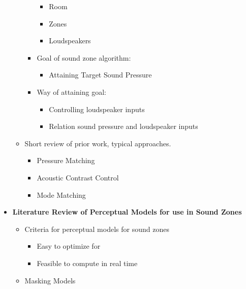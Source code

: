 \begin{itemize}
\begin{itemize}
\begin{itemize}
                        \begin{itemize}
                            \item Room
                            \item Zones
                            \item Loudspeakers
                        \end{itemize}
                    \item Goal of sound zone algorithm:
                        \begin{itemize}
                            \item Attaining Target Sound Pressure
                        \end{itemize}
                    \item Way of attaining goal:
                        \begin{itemize}
                            \item Controlling loudspeaker inputs
                            \item Relation sound pressure and loudspeaker inputs
                        \end{itemize}
                \end{itemize}
            \item Short review of prior work, typical approaches.
                \begin{itemize}
                    \item Pressure Matching
                    \item Acoustic Contrast Control
                    \item Mode Matching
                \end{itemize}
        \end{itemize}
    \item \textbf{Literature Review of Perceptual Models for use in Sound Zones}
        \begin{itemize}
            \item Criteria for perceptual models for sound zones
                \begin{itemize}
                    \item Easy to optimize for
                    \item Feasible to compute in real time
                \end{itemize}
            \item Masking Models
                \begin{itemize}

\end{itemize}
\end{itemize}
\end{itemize}
